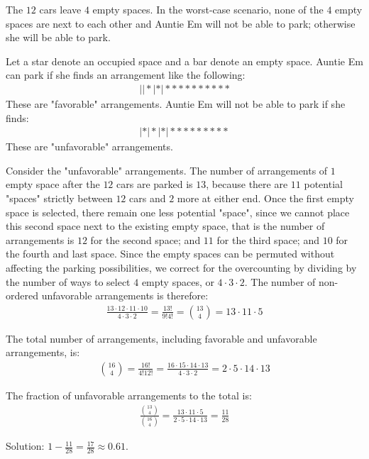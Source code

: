 The $12$ cars leave $4$ empty spaces. In the worst-case scenario, none of the $4$ empty spaces are next to each other and Auntie Em will not be able to park; otherwise she will be able to park. 

Let a star denote an occupied space and a bar denote an empty space. Auntie Em can park if she finds an arrangement like the following:
\begin{align*}
||*|*|**********
\end{align*}
These are "favorable" arrangements. 
Auntie Em will not be able to park if she finds:
\begin{align*}
|*|*|*|*********
\end{align*}
These are "unfavorable" arrangements.

Consider the "unfavorable" arrangements. The number of arrangements of $1$ empty space after the $12$ cars are parked is $13$, because there are $11$ potential "spaces" strictly between $12$ cars and $2$ more at either end. Once the first empty space is selected, there remain one less potential "space", since we cannot place this second space next to the existing empty space, that is the number of arrangements is $12$ for the second space; and $11$ for the third space; and $10$ for the fourth and last space. Since the empty spaces can be permuted without affecting the parking possibilities, we correct for the overcounting by dividing by the number of ways to select $4$ empty spaces, or $4 \cdot 3 \cdot 2$. The number of non-ordered unfavorable arrangements is therefore:
\begin{align*}
\frac{13 \cdot 12 \cdot 11 \cdot 10}{4 \cdot 3 \cdot 2}
= \frac{13!}{9!4!}
= \binom{13}{4}
= 13 \cdot 11 \cdot 5
\end{align*}

The total number of arrangements, including favorable and unfavorable arrangements, is:
\begin{align*}
\binom{16}{4}
= \frac{16!}{4!12!}
= \frac{16 \cdot 15 \cdot 14 \cdot 13}{4 \cdot 3 \cdot 2}
= 2 \cdot 5 \cdot 14 \cdot 13
\end{align*}

The fraction of unfavorable arrangements to the total is:
\begin{align*}
\frac{\displaystyle\binom{13}{4}}{\displaystyle\binom{16}{4}}
= \frac{13 \cdot 11 \cdot 5}{2 \cdot 5 \cdot 14 \cdot 13}
= \frac{11}{28}
\end{align*}

Solution: $1-\displaystyle\frac{11}{28}=\frac{17}{28}\approx 0.61$.
